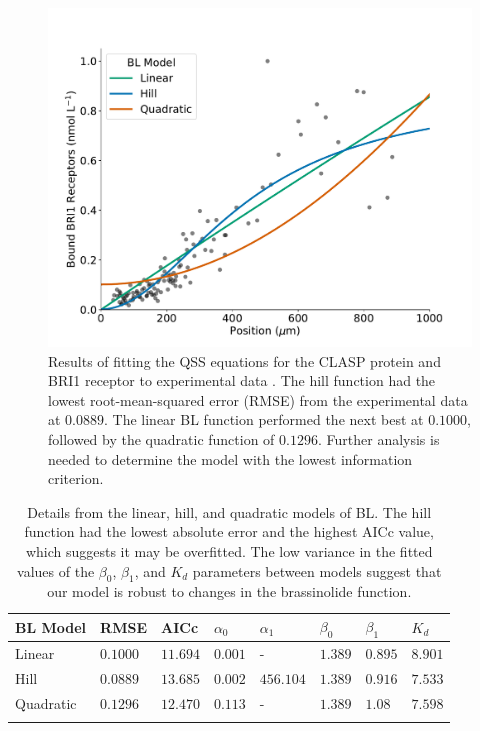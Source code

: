 \documentclass[referee,pdflatex,sn-mathphys-num]{sn-jnl}
\begin{document}
\begin{figure}
  \centering
  \includegraphics[width=\textwidth]{bes1-functions.pdf}
  \caption{Results of fitting the QSS equations for the CLASP protein and BRI1 receptor to experimental data \cite{vukasinovic2021}. The hill function had the lowest root-mean-squared error (RMSE) from the experimental data at $0.0889$. The linear BL function performed the next best at $0.1000$, followed by the quadratic function of $0.1296$. Further analysis is needed to determine the model with the lowest information criterion. }
  \label{bl-functions}
\end{figure}

\begin{table}[ht]
\caption{Details from the linear, hill, and quadratic models of BL. The hill function had the lowest absolute error and the highest AICc value, which suggests it may be overfitted. The low variance in the fitted values of the $\beta_{0}$, $\beta_{1}$, and $K_{d}$ parameters between models suggest that our model is robust to changes in the brassinolide function. }
\label{bl-fits}
\begin{tabular}{@{}llllllll@{}}
\toprule
BL Model & RMSE & AICc & $\alpha_{0}$ & $\alpha_{1}$ & $\beta_{0}$ & $\beta_{1}$ & $K_{d}$ \\
\midrule
Linear & $0.1000$ & $11.694$ & $0.001$ & - & $1.389$ & $0.895$ & $8.901$ \\
Hill & $0.0889$ & $13.685$ & $0.002$ & $456.104$ & $1.389$ & $0.916$ & $7.533$ \\
Quadratic & $0.1296$ & $12.470$ & $0.113$ & - & $1.389$ & $1.08$ & $7.598$ \\
\botrule
\end{tabular}
\end{table}
\end{document}
